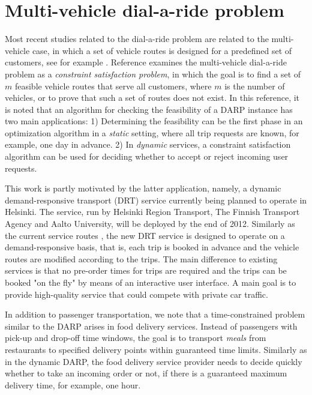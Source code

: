 \documentclass[dissertation,draft*]{aaltoseries}
\begin{document}
\section{Multi-vehicle dial-a-ride problem}
\label{multivehicle}
Most recent studies related to the dial-a-ride problem are related to the multi-vehicle case, in which 
a set of vehicle routes is designed for a predefined set of customers, see for example 
\cite{cordeau02, cordeau01, bent, ropke, xiang2006, melachrinoudis, parragh, garaix, berbegliathesis,berbegliafeas,berbegliapdp}.
Reference \cite{berbegliafeas} examines the multi-vehicle dial-a-ride problem as a \emph{constraint satisfaction problem}, in which the goal
is to find a set of $m$ feasible vehicle routes that serve all customers, where $m$ is the 
number of vehicles, or to prove that such a set of routes does not exist.
In this reference, it is noted that 
an algorithm for checking the feasibility of a DARP instance has two main applications:  
1) Determining the feasibility can be the first phase in an 
optimization algorithm in a \emph{static} setting, where all trip requests are known, for example, one day in advance. 
2) In \emph{dynamic} services, a constraint satisfaction algorithm can be used 
for deciding whether to accept or reject incoming user requests. 

This work is partly motivated by the latter application, namely, a dynamic demand-responsive transport (DRT) service 
currently being planned to operate in Helsinki. The service, run by 
Helsinki Region Transport, The Finnish Transport Agency and Aalto University,
will be deployed by the end of 2012.
Similarly as the current service routes \cite{jouko}, the new DRT
service is designed to operate on a demand-responsive basis, that is, 
each trip is booked in advance and the vehicle routes are modified according to
the trips. The main difference to existing services is 
that no pre-order times for trips are required and the trips can be booked
"on the fly" by means of an interactive user interface. 
A main goal is to provide high-quality service that could compete with
private car traffic. 

In addition to passenger transportation, we note that a time-constrained problem similar to the DARP arises in 
food delivery services. Instead of passengers with pick-up and drop-off time windows, the goal is to transport 
\emph{meals} from restaurants to specified delivery points within guaranteed time limits.
Similarly as in the dynamic DARP, the food delivery service provider needs to decide quickly whether to take an incoming order or not,
if there is a guaranteed maximum delivery time, for example, one hour.
\end{document}
